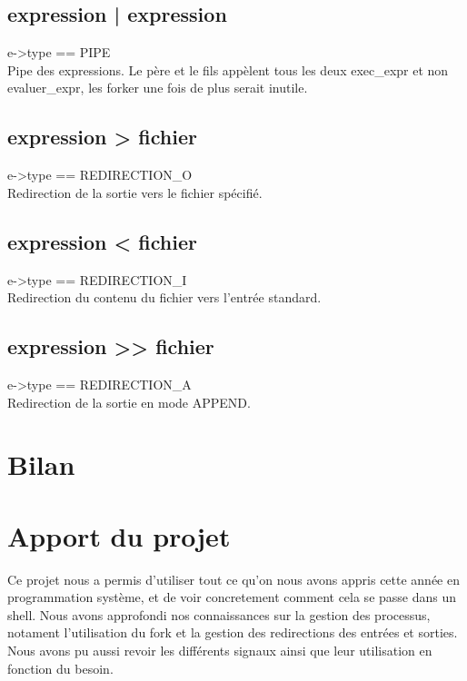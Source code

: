 \documentclass[12pt]{article}
\begin{document}
\subsection{expression | expression}
e->type == PIPE\\
Pipe des expressions. Le père et le fils appèlent tous les deux exec\_expr et non evaluer\_expr,
les forker une fois de plus serait inutile.

\subsection{expression > fichier}
e->type == REDIRECTION\_O\\
Redirection de la sortie vers le fichier spécifié.

\subsection{expression < fichier}
e->type == REDIRECTION\_I\\
Redirection du contenu du fichier vers l'entrée standard.
   

\subsection{expression >> fichier}
e->type == REDIRECTION\_A\\
Redirection de la sortie en mode APPEND.   


\newpage
\section{Bilan}

\newpage
\section{Apport du projet}
Ce projet nous a permis d'utiliser tout ce qu'on nous avons appris cette année en programmation système, et de voir concretement comment cela se passe dans un shell.
Nous avons approfondi nos connaissances sur la gestion des processus, notament l'utilisation du fork et la gestion des redirections des entrées et sorties.
Nous avons pu aussi revoir les différents signaux ainsi que leur utilisation en fonction du besoin.
\end{document}
